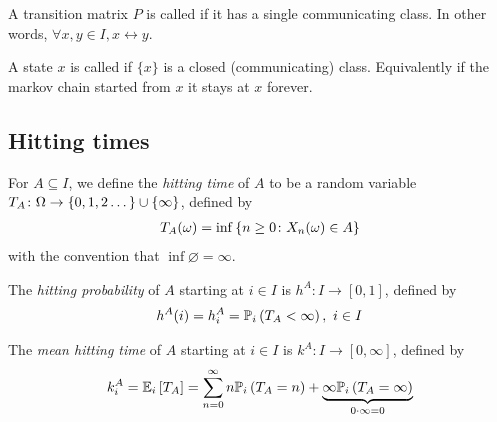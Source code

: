 \begin{definition}[Irreducibility]
	A transition matrix $P$ is called  if it has a single communicating class.
	In other words, $\forall x, y \in I, x \leftrightarrow y$.
\end{definition}

\begin{definition}[Absorption]
	A state $x$ is called  if $\{ x \}$ is a closed (communicating) class.
	Equivalently if the markov chain started from $x$ it stays at $x$ forever.
\end{definition}

\subsection{Hitting times}
\begin{definition}
	For $A \subseteq I$, we define the \textit{hitting time} of $A$ to be a random variable $T_A \colon \Omega \to \qty{0,1,2\dots} \cup \{ \infty \}$, defined by
	\begin{align*}
		T_A(\omega) = \inf \qty{n \geq 0 \colon X_n(\omega) \in A}
	\end{align*}
	with the convention that $\inf \varnothing = \infty$.
\end{definition}

\begin{definition}
	The \textit{hitting probability} of $A$ starting at $i \in I$ is $h^A \colon I \to [0,1]$, defined by
	\begin{align*}
		h^A(i) = h_i^A = \mathbb{P}_{i}\left({T_A < \infty}\right),\ i \in I
	\end{align*}
\end{definition} 

\begin{definition}
	The \textit{mean hitting time} of $A$ starting at $i \in I$ is $k^A \colon I \to [0,\infty]$, defined by
	\begin{align*}
		k_i^A = \mathbb{E}_{i}\left[{T_A}\right] = \sum_{n=0}^\infty n \mathbb{P}_{i}\left({T_A = n}\right) + \underbrace{\infty \mathbb{P}_{i}\left({T_A = \infty}\right)}_{0 \cdot \infty = 0}
	\end{align*}
\end{definition} 

